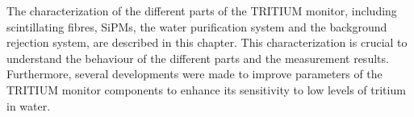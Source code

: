 The characterization of the different parts of the TRITIUM monitor, including scintillating fibres, SiPMs, the water purification system and the background rejection system, are described in this chapter. This characterization is crucial to understand the behaviour of the different parts and the measurement results. Furthermore, several developments were made  to improve parameters of the TRITIUM monitor components to enhance its sensitivity to low levels of tritium in water. %